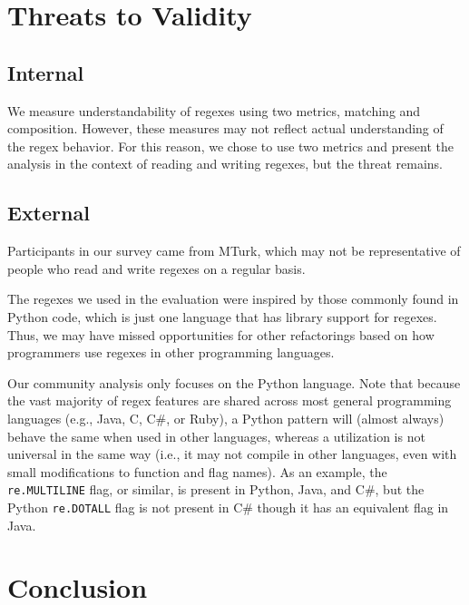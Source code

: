 \section{Threats to Validity}

\subsection{Internal}
We measure understandability of regexes using two metrics, matching and composition. However, these measures may not reflect actual understanding of the regex behavior. For this reason, we chose to use two metrics and present the analysis in the context of reading and writing regexes, but the threat remains.



\subsection{External}
Participants in our survey came from MTurk, which may not be representative of people who read and write regexes on a regular basis.

The regexes we used in the evaluation were inspired by those commonly found in Python code, which is just one language that has library support for regexes. Thus, we may have missed opportunities for other refactorings based on how programmers use regexes in other programming languages.

Our community analysis only focuses on the Python language. Note that because the vast majority of regex features are shared across most general programming languages (e.g., Java, C, C\#, or Ruby), a Python {pattern} will (almost always) behave the same when used in other languages, whereas a utilization is not universal in the same way (i.e., it may not compile in other languages, even with small modifications to function and flag names).
As an example, the {\tt re.MULTILINE} flag, or similar, is present in Python, Java, and C\#, but  the Python {\tt re.DOTALL} flag is not present in C\# though it has an equivalent flag in Java.

\section{Conclusion}
